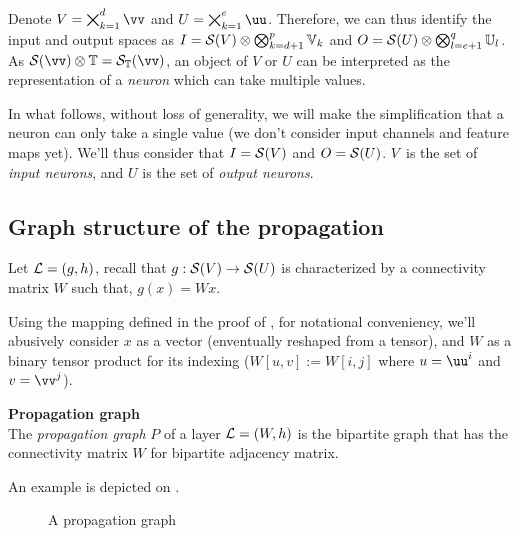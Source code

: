 Denote $V = \bigtimes_{k=1}^d \vv$ and $U = \bigtimes_{k=1}^e \uu$. Therefore, we can thus identify the input and output spaces as $I = \mathcal{S}(V) \otimes \bigotimes_{k=d+1}^p \mathbb{V}_k$ and $O =  \mathcal{S}(U) \otimes \bigotimes_{l=e+1}^q \mathbb{U}_l$. As $\cs(\vv) \otimes \bbt = \cs_{\bbt}(\vv)$, an object of $V$ or $U$ can be interpreted as the representation of a \emph{neuron} which can take multiple values.

In what follows, without loss of generality, we will make the simplification that a neuron can only take a single value (we don't consider input channels and feature maps yet). We'll thus consider that $I = \mathcal{S}(V)$ and $O = \mathcal{S}(U)$. $V$~is the set of \emph{input neurons}, and $U$ is the set of \emph{output neurons}.

\subsection{Graph structure of the propagation}

Let $\mathcal{L} = (g,h)$, recall that $g: \mathcal{S}(V) \rightarrow \mathcal{S}(U)$ is characterized by a connectivity matrix $W$ such that, $g(x) = Wx$.

\begin{remark}Using the mapping defined in the proof of , for notational conveniency, we'll abusively consider $x$ as a vector (enventually reshaped from a tensor), and $W$ as a binary tensor product for its indexing (\ie $W[u,v] := W[i,j]$ where $u = \uu^i$ and $v = \vv^j$).
\end{remark}


\begin{definition}\textbf{Propagation graph}\\
The \emph{propagation graph} $P$ of a layer $\mathcal{L} = (W,h)$ is the bipartite graph that has the connectivity matrix $W$ for bipartite adjacency matrix.
\end{definition}

An example is depicted on .

\begin{figure}[H]
\centering
{}
\caption{A propagation graph}
\label{fig:pgraph}
\end{figure}


